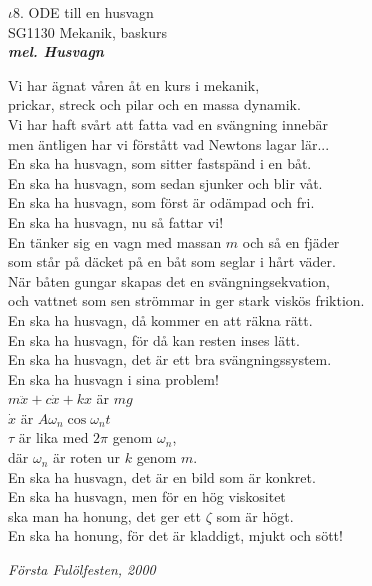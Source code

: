 \documentclass[a6paper,10pt]{article}
\newcommand{\mel}[1]{\small\textbf{\textit{mel. #1 \\}}}
\begin{document}
\setlength{\oddsidemargin}{-0.37in}
\noindent
\begin{center}
\Large $\iota8$. ODE till en husvagn \\ 
\footnotesize SG1130 Mekanik, baskurs\\
\mel{Husvagn}
\end{center}
Vi har ägnat våren åt en kurs i mekanik, \\
prickar, streck och pilar och en massa dynamik. \\
Vi har haft svårt att fatta vad en svängning innebär\\ 
men äntligen har vi förstått vad Newtons lagar lär...
\vspace{5pt} \\
En ska ha husvagn, som sitter fastspänd i en båt. \\
En ska ha husvagn, som sedan sjunker och blir våt. \\
En ska ha husvagn, som först är odämpad och fri. \\
En ska ha husvagn, nu så fattar vi! 
\vspace{5pt} \\
En tänker sig en vagn med massan $m$ och så en fjäder \\
som står på däcket på en båt som seglar i hårt väder. \\
När båten gungar skapas det en svängningsekvation, \\
och vattnet som sen strömmar in ger stark viskös friktion. 
\vspace{5pt} \\
En ska ha husvagn, då kommer en att räkna rätt. \\
En ska ha husvagn, för då kan resten inses lätt. \\
En ska ha husvagn, det är ett bra svängningssystem. \\
En ska ha husvagn i sina problem! 
\vspace{5pt} \\
$m \ddot{x} + c \dot{x} + k x$ är $m g$ \\
$\dot{x}$ är $A \omega_n \cos \omega_n t$ \\
$\tau$ är lika med $2\pi$ genom $\omega_n$, \\
där $\omega_n$ är roten ur $k$ genom $m$.
\vspace{5pt} \\
En ska ha husvagn, det är en bild som är konkret. \\
En ska ha husvagn, men för en hög viskositet \\
ska man ha honung, det ger ett $\zeta$ som är högt. \\
En ska ha honung, för det är kladdigt, mjukt och sött! 
\begin{flushright}
\textit{Första Fulölfesten, 2000}
\end{flushright}
\end{document}
